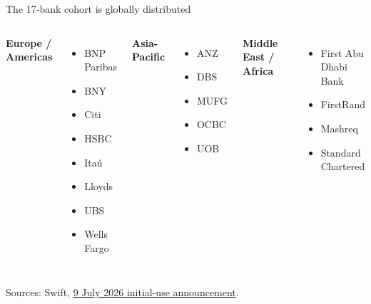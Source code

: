 \documentclass[aspectratio=169,12pt]{beamer}
\newcommand{\rust}[1]{\textcolor{Rust}{\textbf{#1}}}
\newcommand{\blue}[1]{\textcolor{Ocean}{\textbf{#1}}}
\newcommand{\source}[1]{\vfill\par\fontsize{5.4}{6.5}\selectfont\color{Quiet}Sources: #1}
\newcommand{\verytightitems}{\setlength{\itemsep}{0.22em}\setlength{\parskip}{0pt}}
\begin{document}
\begin{frame}{The 17-bank cohort is globally distributed} %
  \fontsize{10.3}{12.4}\selectfont
  \begin{columns}[T,onlytextwidth]
      \rust{Europe / Americas}
      \begin{itemize}\verytightitems
        \item BNP Paribas
        \item BNY
        \item Citi
        \item HSBC
        \item Ita\'u
        \item Lloyds
        \item UBS
        \item Wells Fargo
      \end{itemize}
      \blue{Asia-Pacific}
      \begin{itemize}\verytightitems
        \item ANZ
        \item DBS
        \item MUFG
        \item OCBC
        \item UOB
      \end{itemize}
      \rust{Middle East / Africa}
      \begin{itemize}\verytightitems
        \item First Abu Dhabi Bank
        \item FirstRand
        \item Mashreq
        \item Standard Chartered
      \end{itemize}
  \end{columns}
  \source{Swift, \href{https://www.swift.com/news-events/press-releases/swifts-blockchain-ledger-ready-use-17-banks-set-pioneer-tokenised-cross-border-payments-trusted-global-infrastructure}{9 July 2026 initial-use announcement}.}
\end{frame}
\end{document}
